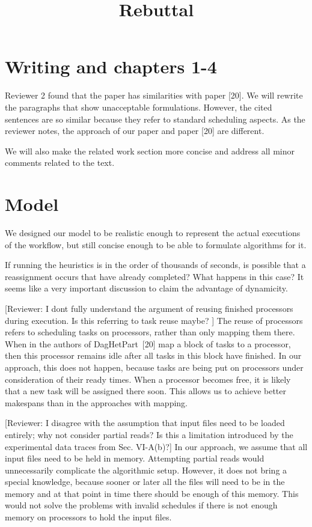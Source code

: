 \documentclass{article}
\newcommand{\review}[1]{{\color{orange}[Reviewer: #1]}}
\begin{document}
    \title{Rebuttal}

    \maketitle

    \section{Writing and chapters 1-4}

   Reviewer 2 found that the paper has similarities with paper [20].
   We will rewrite the paragraphs that show unacceptable formulations.
   However, the cited sentences are so similar because they refer to standard scheduling aspects.
   As the reviewer notes, the approach of our paper and paper [20] are different.


    We will also make the related work section more concise and address all minor comments related to the text.


    \section{Model}

    We designed our model to be realistic enough to represent the actual executions of the workflow, but still concise
    enough to be able to formulate algorithms for it.

    If running the heuristics is in the order of thousands of seconds,
    is possible that a reassignment occurs that have already completed? What
    happens in this case? It seems like a very important discussion to
    claim  the advantage of dynamicity.

    \review{I dont fully understand the argument of reusing finished processors during execution.
    Is this referring to task reuse maybe? }
    The reuse of processors refers to scheduling tasks on processors, rather than only mapping them there.
    When in the authors of DagHetPart~[20] map a block of tasks to a processor, then this processor remains idle after
    all tasks in this block have finished.
    In our approach, this does not happen, because tasks are being put on processors under consideration of their ready times.
    When a processor becomes free, it is likely that a new task will be assigned there soon.
    This allows us to achieve better makespans than in the approaches with mapping.

    \review{I disagree with the assumption that input files need to be loaded entirely; why not consider partial reads?
    Is this a limitation introduced by the experimental data traces from Sec. VI-A(b)?}
    In our approach, we assume that all input files need to be held in memory.
    Attempting partial reads would unnecessarily complicate the algorithmic setup.
    However, it does not bring a special knowledge, because sooner or later all the files will need to be in the memory
    and at that point in time there should be enough of this memory.
    This would not solve the problems with invalid schedules if there is not enough memory on processors to hold the input files.
\end{document}
